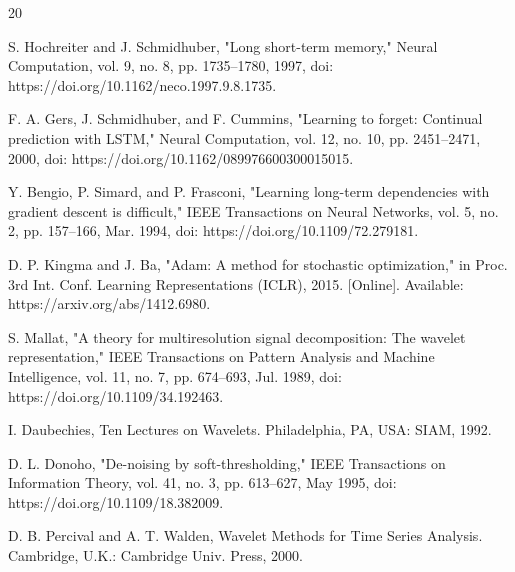 \documentclass[journal]{IEEEtran}
\begin{document}
%
%
%
\begin{thebibliography}{20}

S. Hochreiter and J. Schmidhuber, "Long short-term memory," Neural Computation, vol. 9, no. 8, pp. 1735--1780, 1997, doi: https://doi.org/10.1162/neco.1997.9.8.1735.

F. A. Gers, J. Schmidhuber, and F. Cummins, "Learning to forget: Continual prediction with LSTM," Neural Computation, vol. 12, no. 10, pp. 2451--2471, 2000, doi: https://doi.org/10.1162/089976600300015015.

Y. Bengio, P. Simard, and P. Frasconi, "Learning long-term dependencies with gradient descent is difficult," IEEE Transactions on Neural Networks, vol. 5, no. 2, pp. 157--166, Mar. 1994, doi: https://doi.org/10.1109/72.279181.

D. P. Kingma and J. Ba, "Adam: A method for stochastic optimization," in Proc. 3rd Int. Conf. Learning Representations (ICLR), 2015. [Online]. Available: https://arxiv.org/abs/1412.6980.

S. Mallat, "A theory for multiresolution signal decomposition: The wavelet representation," IEEE Transactions on Pattern Analysis and Machine Intelligence, vol. 11, no. 7, pp. 674--693, Jul. 1989, doi: https://doi.org/10.1109/34.192463.

I. Daubechies, Ten Lectures on Wavelets. Philadelphia, PA, USA: SIAM, 1992.

D. L. Donoho, "De-noising by soft-thresholding," IEEE Transactions on Information Theory, vol. 41, no. 3, pp. 613--627, May 1995, doi: https://doi.org/10.1109/18.382009.

D. B. Percival and A. T. Walden, Wavelet Methods for Time Series Analysis. Cambridge, U.K.: Cambridge Univ. Press, 2000.


\end{thebibliography}
\end{document}
